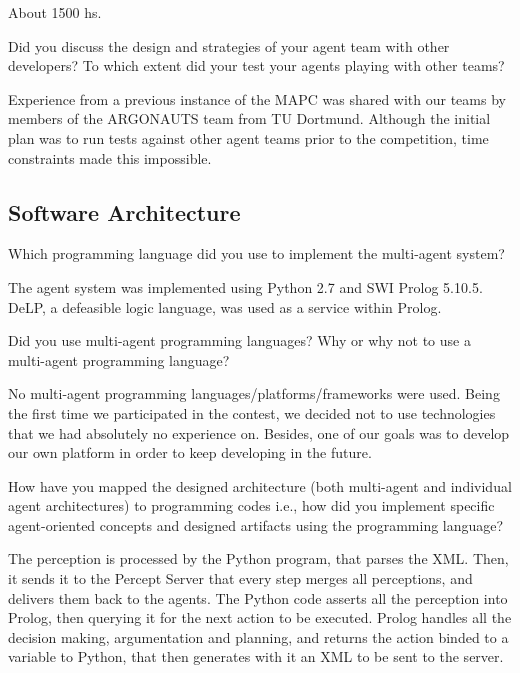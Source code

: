 
About 1500 hs.

\begin{question}
Did you discuss the design and strategies of your agent team with other
developers? To which extent did your test your agents playing with other
teams?
\end{question}

Experience from a previous instance of the MAPC was shared with our
teams by members of the ARGONAUTS team from TU Dortmund\cite{Holzgen:2011}. 
Although the initial plan was to run tests against other agent teams prior to the
competition, time constraints made this impossible.

\subsection{Software Architecture}
\setcounter{question}{0}
\begin{question}
Which programming language did you use to
implement the multi-agent system?  
\end{question}

The agent system was implemented using
Python 2.7 and SWI Prolog 5.10.5. DeLP, a defeasible logic language, was used
as a service within Prolog.

\begin{question}
Did you use multi-agent programming languages? Why or why not to use a
multi-agent programming language?  
\end{question}

No multi-agent programming
languages/platforms/frameworks were used. Being the first time we participated
in the contest, we decided not to use technologies that we had absolutely no experience on. Besides,
one of our goals was to develop our own platform in order to keep developing in the future.

\begin{question}
How have you mapped the designed architecture (both multi-agent and
individual agent architectures) to programming codes i.e., how did you
implement specific agent-oriented concepts and designed artifacts using the
programming language?  
\end{question}

The perception is processed by the Python program, that
parses the XML. Then, it sends it to the Percept Server that every step merges
all perceptions, and delivers them back to the agents.  The Python code
asserts all the perception into Prolog, then querying it for the next action
to be executed.  Prolog handles all the decision making, argumentation and
planning, and returns the action binded to a variable to Python, that then
generates with it an XML to be sent to the server.

